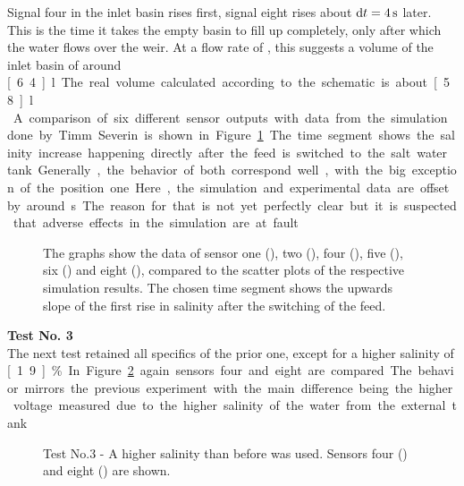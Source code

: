  Signal four in the inlet basin rises first, signal eight rises about $\diff t =  \unit[4]{s}$ later. This is the time it takes the empty basin to fill up completely, only after which the water flows over the weir. At a flow rate of , this suggests a volume of the inlet basin of around \unit[6.4]{l}. The real volume calculated according to the schematic is about \unit[5.8]{l}.\\

A comparison of six different sensor outputs with data from the simulation done by Timm Severin is shown in Figure \ref{fig:test2_sim}. The time segment shows the salinity increase happening directly after the feed is switched to the salt water tank. Generally, the behavior of both correspond well, with the big exception of the position one. Here, the simulation and experimental data are offset by around \unit[2]{s}. The reason for that is not yet perfectly clear but it is suspected that adverse effects in the simulation are at fault.\\

\begin{figure}[H]
	\begin{center}
		
		\caption[The graphs show the data of the sensors compared to the scatter plots of the respective simulation results.]{The graphs show the data of sensor one (\drawline[blue]), two (), four (\drawline[cyan]), five (), six () and eight (\drawline[red]), compared to the scatter plots of the respective simulation results. The chosen time segment shows the upwards slope of the first rise in salinity after the switching of the feed.}
		\label{fig:test2_sim}
	\end{center}
\end{figure}

\textbf{Test No. 3}\\

The next test retained all specifics of the prior one, except for a higher salinity of \unit[1.9]{\%}. In Figure \ref{fig:test3} again sensors four and eight are compared. The behavior mirrors the previous experiment with the main difference being the higher voltage measured due to the higher salinity of the water from the external tank.\\

\begin{figure}[H]
	\begin{center}
		
		\caption[Test No.3]{Test No.3 - A higher salinity than before was used. Sensors four (\drawline[cyan]) and eight (\drawline[red]) are shown.}
		\label{fig:test3}
	\end{center}
\end{figure}

